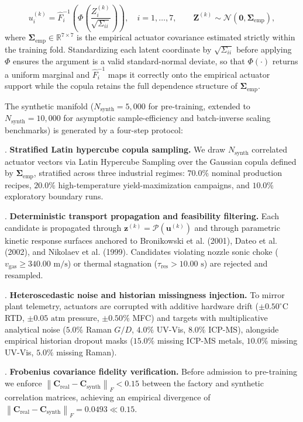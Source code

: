\documentclass[10pt,journal,onecolumn]{IEEEtran}
\begin{document}
\begin{equation}
u_i^{(k)} = \hat{F}_i^{-1}\!\left(\Phi\!\left(\frac{Z_i^{(k)}}{\sqrt{\Sigma_{ii}}}\right)\right), \quad i = 1, \dots, 7, \qquad \mathbf{Z}^{(k)} \sim \mathcal{N}\!\left(\mathbf{0}, \boldsymbol{\Sigma}_{\text{emp}}\right),
\end{equation}
where $\boldsymbol{\Sigma}_{\text{emp}} \in \mathbb{R}^{7 \times 7}$ is the empirical actuator covariance estimated strictly within the training fold. Standardizing each latent coordinate by $\sqrt{\Sigma_{ii}}$ before applying $\Phi$ ensures the argument is a valid standard-normal deviate, so that $\Phi(\cdot)$ returns a uniform marginal and $\hat{F}_i^{-1}$ maps it correctly onto the empirical actuator support while the copula retains the full dependence structure of $\boldsymbol{\Sigma}_{\text{emp}}$.

The synthetic manifold ($N_{\text{synth}} = 5,000$ for pre-training, extended to $N_{\text{synth}} = 10,000$ for asymptotic sample-efficiency and batch-inverse scaling benchmarks) is generated by a four-step protocol:

. \textbf{Stratified Latin hypercube copula sampling.} We draw $N_{\text{synth}}$ correlated actuator vectors via Latin Hypercube Sampling over the Gaussian copula defined by $\boldsymbol{\Sigma}_{\text{emp}}$, stratified across three industrial regimes: $70.0\%$ nominal production recipes, $20.0\%$ high-temperature yield-maximization campaigns, and $10.0\%$ exploratory boundary runs.\par\smallskip
{}. \textbf{Deterministic transport propagation and feasibility filtering.} Each candidate is propagated through $\mathbf{z}^{(k)} = \mathcal{P}(\mathbf{u}^{(k)})$ and through parametric kinetic response surfaces anchored to Bronikowski et al. (2001), Dateo et al. (2002), and Nikolaev et al. (1999). Candidates violating nozzle sonic choke ($v_{\text{gas}} \ge 340.00\text{ m/s}$) or thermal stagnation ($\tau_{\text{res}} > 10.00\text{ s}$) are rejected and resampled.\par\smallskip
{}. \textbf{Heteroscedastic noise and historian missingness injection.} To mirror plant telemetry, actuators are corrupted with additive hardware drift ($\pm 0.50^\circ\text{C}$ RTD, $\pm 0.05\text{ atm}$ pressure, $\pm 0.50\%$ MFC) and targets with multiplicative analytical noise ($5.0\%$ Raman $G/D$, $4.0\%$ UV-Vis, $8.0\%$ ICP-MS), alongside empirical historian dropout masks ($15.0\%$ missing ICP-MS metals, $10.0\%$ missing UV-Vis, $5.0\%$ missing Raman).\par\smallskip
{}. \textbf{Frobenius covariance fidelity verification.} Before admission to pre-training we enforce $\left\|\mathbf{C}_{\text{real}} - \mathbf{C}_{\text{synth}}\right\|_F < 0.15$ between the factory and synthetic correlation matrices, achieving an empirical divergence of $\left\|\mathbf{C}_{\text{real}} - \mathbf{C}_{\text{synth}}\right\|_F = 0.0493 \ll 0.15$.\par\smallskip
\end{document}
